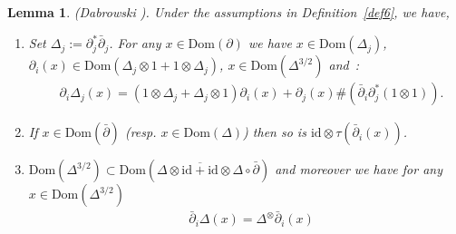 \documentclass[10pt,a4paper,reqno]{amsart}
\newtheorem{lemma}[theorem]{Lemma}
\def\o{\omega}
\newcommand{\Dom}{\mathrm{Dom}}
\begin{document}
\begin{lemma}\label{in2deltaDelta}(Dabrowski \cite[Lemma~19]{Dab14}). Under the assumptions in Definition~\ref{def6}, we have,%
\begin{enumerate}
\item
Set $\Delta_j:=\partial_j^*\bar\partial_j$. For any $x\in \Dom(\partial)$ we have 
$x\in \Dom(\Delta_j)$, %
$\partial_i(x)\in \Dom(\Delta_j\otimes1+1\otimes \Delta_j)$, $x\in \Dom(\Delta^{3/2})$ and~:
 \begin{align*} 
&{\partial}_{i}\Delta_{j}(x)= (1 \otimes \Delta_j+\Delta_{j}\otimes 1){\partial}_i(x)%
+\partial_{j}(x)\#(\bar{\partial}_{i}\partial_{j}^{*}(1\otimes 1) ).
\end{align*}
\item
 If $x\in \Dom(\bar{\partial})$ (resp. $x\in \Dom(\Delta)$)  then so is $\mathrm{id}\otimes\tau({\bar{\partial}_i}(x))$. 
\item
$\Dom(\Delta^{3/2})\subset \Dom(\overline{\Delta \otimes\mathrm{id}+\mathrm{id}\otimes \Delta }\circ\bar{\partial} )$ and moreover we have for any $x\in \Dom(\Delta^{3/2})$ \begin{align*} 
&\bar{\partial}_{i}\Delta(x)= \Delta^{\otimes}\bar{\partial}_i(x)%

\end{align*}
\end{enumerate}
\end{lemma}
\end{document}
